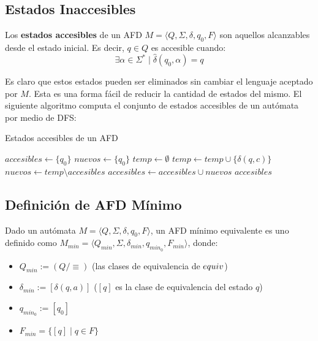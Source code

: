 \subsection{Estados Inaccesibles}

Los \textbf{estados accesibles} de un AFD $M = \langle Q, \Sigma, \delta, q_0, F \rangle$ son aquellos alcanzables desde el estado inicial. Es decir, $q \in Q$ es accesible cuando:
$$
    \exists \alpha \in \Sigma^* \mid \hat \delta(q_0, \alpha) = q
$$

Es claro que estos estados pueden ser eliminados sin cambiar el lenguaje aceptado por $M$. Esta es una forma fácil de reducir la cantidad de estados del mismo. El siguiente algoritmo computa el conjunto de estados accesibles de un autómata por medio de DFS:



\begin{algorithm}[H]
    \caption{Estados accesibles de un AFD}
    \label{accesibles}
    \begin{algorithmic}[1]
        \State $accesibles \gets \{q_0\}$
        \State $nuevos \gets \{q_0\}$
        \Repeat
        \State $temp \gets \emptyset$
        \State $temp \gets temp \cup \{\delta(q, c)\}$
        \EndFor
        \EndFor
        \State $nuevos \gets temp \setminus accesibles$
        \State $accesibles \gets accesibles \cup nuevos$
        \State \Return $accesibles$
        \EndProcedure
    \end{algorithmic}
\end{algorithm}

\subsection{Definición de AFD Mínimo}

Dado un autómata $M = \langle Q, \Sigma, \delta, q_0, F \rangle$, un AFD mínimo equivalente es uno definido como $M_{min} = \langle Q_{min}, \Sigma, \delta_{min}, q_{min_0}, F_{min} \rangle$, donde:

\begin{itemize}
    \item $Q_{min} := (Q / \mathop\equiv)$ (las clases de equivalencia de $\addcontentsline{file}{secunit}{entry}equiv$)
    \item $\delta_{min} := [\delta(q, a)]$ ($[q]$ es la clase de equivalencia del estado $q$)
    \item $q_{min_0} := [q_0]$
    \item $F_{min} = \{[q] \mid q \in F\}$
\end{itemize}

